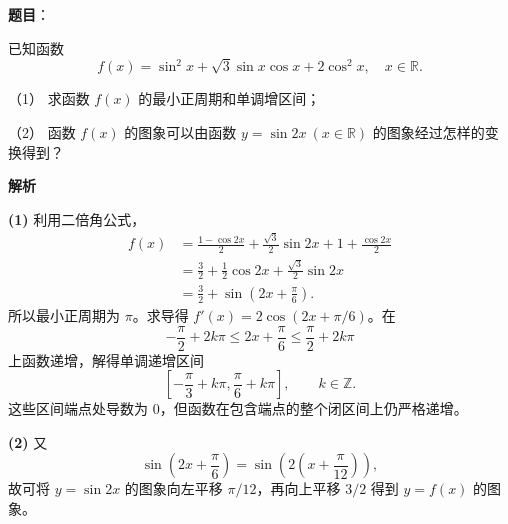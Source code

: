 \begin{answer}

\textbf{题目}：

已知函数
\nopagebreak[4]
\[
f(x)=\sin^2 x+\sqrt{3}\sin x\cos x+2\cos^2 x,\quad x\in\mathbb{R}.
\]

（1） 求函数 $f(x)$ 的最小正周期和单调增区间；

（2） 函数 $f(x)$ 的图象可以由函数 $y=\sin 2x\ (x\in\mathbb{R})$ 的图象经过怎样的变换得到？

\textbf{解析}

\textbf{(1)} 利用二倍角公式，
\nopagebreak[4]
\[
\begin{aligned}
f(x)
&=\frac{1-\cos2x}{2}+\frac{\sqrt3}{2}\sin2x+1+\frac{\cos2x}{2}\\
&=\frac32+\frac12\cos2x+\frac{\sqrt3}{2}\sin2x\\
&=\frac32+\sin\left(2x+\frac\pi6\right).
\end{aligned}
\]
所以最小正周期为 $\pi$。求导得 $f'(x)=2\cos(2x+\pi/6)$。在
\nopagebreak[4]
\[
-\frac\pi2+2k\pi\le2x+\frac\pi6\le\frac\pi2+2k\pi
\]
上函数递增，解得单调递增区间
\nopagebreak[4]
\[
\left[-\frac\pi3+k\pi,\frac\pi6+k\pi\right],\qquad k\in\mathbb Z.
\]
这些区间端点处导数为 $0$，但函数在包含端点的整个闭区间上仍严格递增。

\textbf{(2)} 又
\nopagebreak[4]
\[
\sin\left(2x+\frac\pi6\right)=\sin\left(2\left(x+\frac\pi{12}\right)\right),
\]
故可将 $y=\sin2x$ 的图象向左平移 $\pi/12$，再向上平移 $3/2$ 得到 $y=f(x)$ 的图象。



\end{answer}
